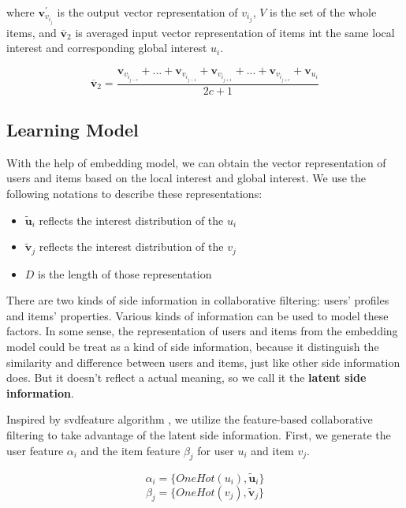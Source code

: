 \documentclass{sig-alternate-05-2015}
\begin{document}
where $\mathbf{v}_{v_{i_j}}^{'}$ is the output vector representation of $v_{i_j}$,
$V$ is the set of the whole items,
and $\overline{\mathbf{v}}_{2}$ is averaged input vector representation of items
int the same local interest and corresponding global interest $u_i$.

\begin{equation}
	\overline{\mathbf{v}}_{2} = \frac{ \mathbf{v}_{v_{i_{j-c}}} + ... + \mathbf{v}_{v_{i_{j-1}}} + 
	\mathbf{v}_{v_{i_{j+1}}} + ... + \mathbf{v}_{v_{i_{j+c}}} + \mathbf{v}_{u_i} }{2c+1}
\end{equation}


\subsection{Learning Model}
With the help of embedding model, we can obtain
the vector representation of users and items
based on the local interest and global interest.
We use the following notations to describe these representations:

\begin{itemize}
	\item $\tilde{\mathbf{u}}_i$ reflects the interest distribution of the $u_i$
	\item $\tilde{\mathbf{v}}_j$ reflects the interest distribution of the $v_j$
	\item $D$ is the length of those representation
\end{itemize}

There are two kinds of side information in collaborative filtering:
users' profiles and items' properties.
Various kinds of information can be used to model these factors.
In some sense, the representation of users and items from the embedding model
could be treat as a kind of side information,
because it distinguish the similarity and difference between users and items,
just like other side information does.
But it doesn't reflect a actual meaning, so we call it the \textbf{latent side information}. 

Inspired by svdfeature algorithm \cite{chen2012svdfeature}, we utilize the feature-based
collaborative filtering to take advantage of the latent side information.
First, we generate the user feature $\alpha_{i}$ and the item feature $\beta_{j}$
for user $u_i$ and item $v_j$.

\begin{equation}
\alpha_{i} = \{ OneHot(u_i), \tilde{\mathbf{u}}_i \}
\end{equation}
\begin{equation}
\beta_{j} = \{OneHot(v_j), \tilde{\mathbf{v}}_j \}
\end{equation}
\end{document}
